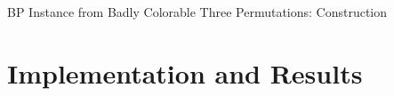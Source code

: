 \documentclass[xcolor=table]{beamer} %
\theoremstyle{definition}
\theoremstyle{plain}
\theoremstyle{remark}
\renewcommand{\a}[1]{\textcolor{dred}{#1}}
\begin{document}
\begin{frame}{BP Instance from Badly Colorable Three Permutations: Construction}



\end{frame}


\section{Implementation and Results}


    
    
    
\end{document}
